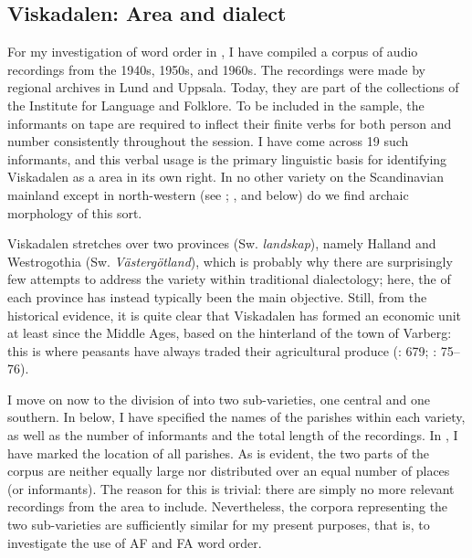 \documentclass[output=paper,colorlinks,citecolor=brown,draft,draftmode]{langscibook}
\begin{document}
\subsection{Viskadalen: Area and dialect}\label{sec:petzell:2.1}


For my investigation of  word order in , I have compiled a corpus of audio recordings from the 1940s, 1950s, and 1960s. The recordings were made by regional  archives in Lund and Uppsala. Today, they are part of the collections of the Institute for Language and Folklore. To be included in the sample, the informants on tape are required to inflect their finite verbs for both person and number consistently throughout the session. I have come across 19 such informants, and this verbal usage is the primary linguistic basis for identifying Viskadalen as a  area in its own right. In no other variety on the Scandinavian mainland except in north-western  (see \citealt{Levander1928}; \citealt{Garbacz2010}, and  below) do we find archaic morphology of this sort.



Viskadalen stretches over two provinces (Sw. \textit{landskap}), namely Halland and Westrogothia (Sw. \textit{Västergötland}), which is probably why there are surprisingly few attempts to address the variety within traditional dialectology; here, the  of each province has instead typically been the main objective. Still, from the historical evidence, it is quite clear that Viskadalen has formed an economic unit at least since the Middle Ages, based on the hinterland of the town of Varberg: this is where  peasants have always traded their agricultural produce (\citealt{Grill1954}: 679; \citealt{Linge1969}: 75–76).



I move on now to the division of  into two sub-varieties, one central and one southern. In  below, I have specified the names of the parishes within each variety, as well as the number of informants and the total length of the recordings. In , I have marked the location of all parishes. As is evident, the two parts of the corpus are neither equally large nor distributed over an equal number of places (or informants). The reason for this is trivial: there are simply no more relevant recordings from the area to include. Nevertheless, the corpora representing the two sub-varieties are sufficiently similar for my present purposes, that is, to investigate the use of AF and FA word order.
\end{document}
